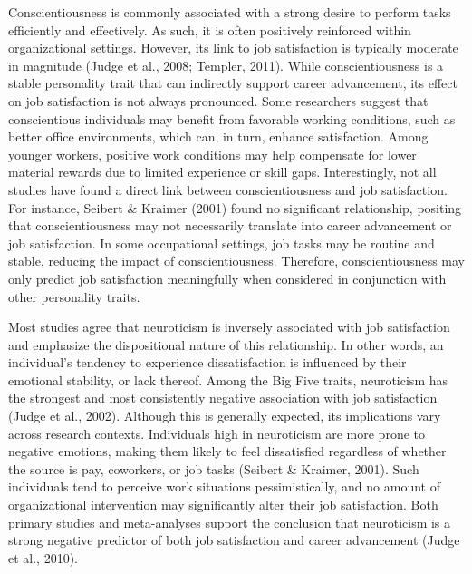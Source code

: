 \documentclass[
]{interact}
\begin{document}
Conscientiousness is commonly associated with a strong desire to perform
tasks efficiently and effectively. As such, it is often positively
reinforced within organizational settings. However, its link to job
satisfaction is typically moderate in magnitude (Judge et al., 2008;
Templer, 2011). While conscientiousness is a stable personality trait
that can indirectly support career advancement, its effect on job
satisfaction is not always pronounced. Some researchers suggest that
conscientious individuals may benefit from favorable working conditions,
such as better office environments, which can, in turn, enhance
satisfaction. Among younger workers, positive work conditions may help
compensate for lower material rewards due to limited experience or skill
gaps. Interestingly, not all studies have found a direct link between
conscientiousness and job satisfaction. For instance, Seibert \& Kraimer
(2001) found no significant relationship, positing that
conscientiousness may not necessarily translate into career advancement
or job satisfaction. In some occupational settings, job tasks may be
routine and stable, reducing the impact of conscientiousness. Therefore,
conscientiousness may only predict job satisfaction meaningfully when
considered in conjunction with other personality traits.

Most studies agree that neuroticism is inversely associated with job
satisfaction and emphasize the dispositional nature of this
relationship. In other words, an individual's tendency to experience
dissatisfaction is influenced by their emotional stability, or lack
thereof. Among the Big Five traits, neuroticism has the strongest and
most consistently negative association with job satisfaction (Judge et
al., 2002). Although this is generally expected, its implications vary
across research contexts. Individuals high in neuroticism are more prone
to negative emotions, making them likely to feel dissatisfied regardless
of whether the source is pay, coworkers, or job tasks (Seibert \&
Kraimer, 2001). Such individuals tend to perceive work situations
pessimistically, and no amount of organizational intervention may
significantly alter their job satisfaction. Both primary studies and
meta-analyses support the conclusion that neuroticism is a strong
negative predictor of both job satisfaction and career advancement
(Judge et al., 2010).
\end{document}
